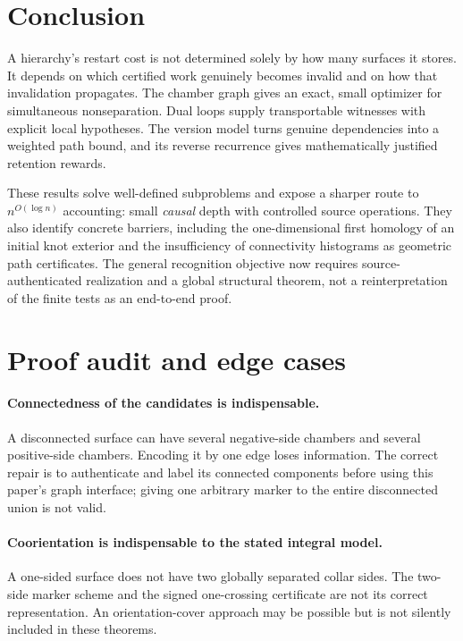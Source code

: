 \documentclass[11pt]{article}
\theoremstyle{definition}
\begin{document}
\section{Conclusion}
A hierarchy's restart cost is not determined solely by how many surfaces it stores. It depends on which certified work genuinely becomes invalid and on how that invalidation propagates. The chamber graph gives an exact, small optimizer for simultaneous nonseparation. Dual loops supply transportable witnesses with explicit local hypotheses. The version model turns genuine dependencies into a weighted path bound, and its reverse recurrence gives mathematically justified retention rewards.

These results solve well-defined subproblems and expose a sharper route to $n^{O(\log n)}$ accounting: small \emph{causal} depth with controlled source operations. They also identify concrete barriers, including the one-dimensional first homology of an initial knot exterior and the insufficiency of connectivity histograms as geometric path certificates. The general recognition objective now requires source-authenticated realization and a global structural theorem, not a reinterpretation of the finite tests as an end-to-end proof.

\appendix
\section{Proof audit and edge cases}\label{app:audit}
\paragraph{Connectedness of the candidates is indispensable.}
A disconnected surface can have several negative-side chambers and several positive-side chambers. Encoding it by one edge loses information. The correct repair is to authenticate and label its connected components before using this paper's graph interface; giving one arbitrary marker to the entire disconnected union is not valid.

\paragraph{Coorientation is indispensable to the stated integral model.}
A one-sided surface does not have two globally separated collar sides. The two-side marker scheme and the signed one-crossing certificate are not its correct representation. An orientation-cover approach may be possible but is not silently included in these theorems.
\end{document}

